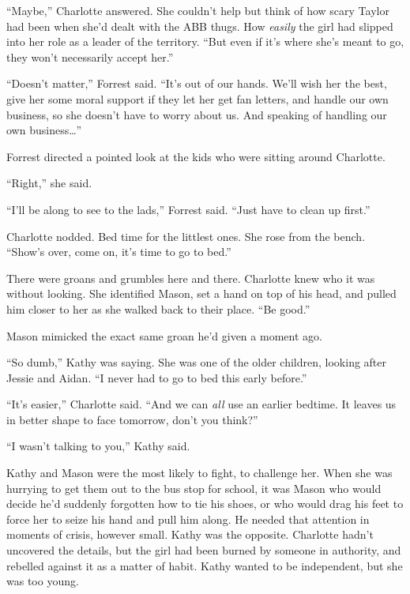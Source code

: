 ``Maybe,'' Charlotte answered.  She couldn't help but think of how scary Taylor had been when she'd dealt with the ABB thugs.  How \emph{easily} the girl had slipped into her role as a leader of the territory.  ``But even if it's where she's meant to go, they won't necessarily accept her.''



``Doesn't matter,'' Forrest said.  ``It's out of our hands.  We'll wish her the best, give her some moral support if they let her get fan letters, and handle our own business, so she doesn't have to worry about us.  And speaking of handling our own business\ldots''



Forrest directed a pointed look at the kids who were sitting around Charlotte.



``Right,'' she said.



``I'll be along to see to the lads,'' Forrest said.  ``Just have to clean up first.''



Charlotte nodded.  Bed time for the littlest ones.  She rose from the bench.  ``Show's over, come on, it's time to go to bed.''



There were groans and grumbles here and there.  Charlotte knew who it was without looking.  She identified Mason, set a hand on top of his head, and pulled him closer to her as she walked back to their place.  ``Be good.''



Mason mimicked the exact same groan he'd given a moment ago.



``So dumb,'' Kathy was saying.  She was one of the older children, looking after Jessie and Aidan.  ``I never had to go to bed this early before.''



``It's easier,'' Charlotte said.  ``And we can \emph{all} use an earlier bedtime.  It leaves us in better shape to face tomorrow, don't you think?''



``I wasn't talking to you,'' Kathy said.



Kathy and Mason were the most likely to fight, to challenge her.  When she was hurrying to get them out to the bus stop for school, it was Mason who would decide he'd suddenly forgotten how to tie his shoes, or who would drag his feet to force her to seize his hand and pull him along.  He needed that attention in moments of crisis, however small.  Kathy was the opposite.  Charlotte hadn't uncovered the details, but the girl had been burned by someone in authority, and rebelled against it as a matter of habit.  Kathy wanted to be independent, but she was too young.



